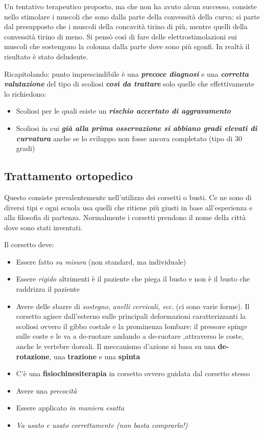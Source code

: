 Un tentativo terapeutico proposto, ma che non ha avuto alcun successo, consiste nello stimolare i muscoli che sono dalla parte della convessità della curva: si parte dal presupposto che i muscoli della concavità tirino di più, mentre quelli della convessità tirino di meno. Si pensò
così di fare delle elettrostimolazioni sui muscoli che sostengono la colonna dalla parte dove sono più sgonfi. In realtà il risultato è stato deludente.

Ricapitolando: punto imprescindibile è una \textbf{\emph{precoce diagnosi}} e una \textbf{\emph{corretta}} \textbf{\emph{valutazione}}
del tipo di scoliosi \textbf{\emph{così da trattare}} solo quelle che effettivamente lo richiedono:

\begin{itemize}
\item
  Scoliosi per le quali esiste un \textbf{\emph{rischio accertato di aggravamento}}
\item
  Scoliosi in cui \textbf{\emph{già alla prima osservazione si abbiano gradi elevati di curvatura}} anche se lo sviluppo non fosse ancora completato (tipo di 30 gradi)
\end{itemize}

\subsection{Trattamento ortopedico}
Questo consiste prevalentemente nell'utilizzo dei corsetti o busti. Ce ne sono di diversi tipi e ogni scuola usa quelli che ritiene più giusti in base all'esperienza e alla filosofia di partenza. Normalmente i corsetti prendono il nome della città dove sono stati inventati.

Il corsetto deve:

\begin{itemize}
\item
  Essere fatto \emph{su misura} (non standard, ma individuale)
\item
  Essere \emph{rigido} altrimenti è il paziente che piega il busto e non è il busto che raddrizza il paziente
\item
  Avere delle sbarre di \emph{sostegno}, \emph{anelli cervicali, ecc}. (ci sono varie forme). Il corsetto agisce dall'esterno sulle principali deformazioni caratterizzanti la scoliosi ovvero il gibbo costale e la prominenza lombare: il pressore spinge sulle coste e le va a de-ruotare andando a de-ruotare ,attraverso le coste, anche le vertebre dorsali. Il meccanismo d'azione si basa su una \textbf{de-rotazione}, una \textbf{trazione} e una \textbf{spinta}
\item
  C'è una \textbf{fisiochinesiterapia} in corsetto ovvero guidata dal corsetto stesso
\item
  Avere una \emph{precocità}
\item
  Essere applicato \emph{in maniera esatta}
\item
  \emph{\emph{Va usato e usato correttamente (non basta comprarlo!)}}
\end{itemize}

